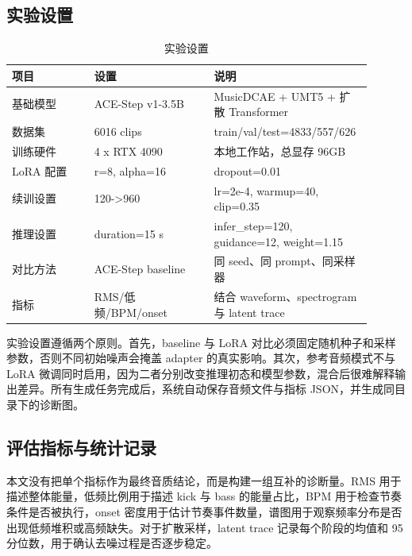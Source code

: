 \documentclass[UTF8,a4paper,zihao=-4,fontset=none]{ctexart}
\begin{document}
\subsection{实验设置}
\begin{table}[H]
\centering
\caption{实验设置}
\small
\begin{tabular}{p{0.22\linewidth}p{0.32\linewidth}p{0.36\linewidth}}
\toprule
项目 & 设置 & 说明 \\
\midrule
基础模型 & ACE-Step v1-3.5B & MusicDCAE + UMT5 + 扩散 Transformer \\
数据集 & 6016 clips & train/val/test=4833/557/626 \\
训练硬件 & 4 x RTX 4090 & 本地工作站，总显存 96GB \\
LoRA 配置 & r=8, alpha=16 & dropout=0.01 \\
续训设置 & 120->960 & lr=2e-4, warmup=40, clip=0.35 \\
推理设置 & duration=15 s & infer\_step=120, guidance=12, weight=1.15 \\
对比方法 & ACE-Step baseline & 同 seed、同 prompt、同采样器 \\
指标 & RMS/低频/BPM/onset & 结合 waveform、spectrogram 与 latent trace \\
\bottomrule
\end{tabular}
\end{table}
实验设置遵循两个原则。首先，baseline 与 LoRA 对比必须固定随机种子和采样参数，否则不同初始噪声会掩盖 adapter 的真实影响。其次，参考音频模式不与 LoRA 微调同时启用，因为二者分别改变推理初态和模型参数，混合后很难解释输出差异。所有生成任务完成后，系统自动保存音频文件与指标 JSON，并生成同目录下的诊断图。

\subsection{评估指标与统计记录}
本文没有把单个指标作为最终音质结论，而是构建一组互补的诊断量。RMS 用于描述整体能量，低频比例用于描述 kick 与 bass 的能量占比，BPM 用于检查节奏条件是否被执行，onset 密度用于估计节奏事件数量，谱图用于观察频率分布是否出现低频堆积或高频缺失。对于扩散采样，latent trace 记录每个阶段的均值和 95 分位数，用于确认去噪过程是否逐步稳定。
\end{document}
